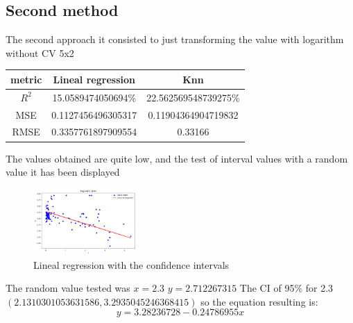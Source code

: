 \documentclass{article}
\begin{document}
\subsection{Second method}
The second approach it consisted to just transforming the value with logarithm without CV 5x2
\begin{center}
  \begin{tabular}{|c|c|c|}
    \hline
     metric & Lineal regression & Knn \\ \hline
     $R^2$& 15.0589474050694\%&22.562569548739275\%\\
     MSE&0.1127456496305317&0.11904364904719832\\
     RMSE&0.3357761897909554&0.33166\\
     \hline
  \end{tabular}
\end{center}
The values obtained are quite low, and the test of interval values with a random value it has been displayed 
\begin{figure}[h]
  \includegraphics[width=0.35\textwidth]{model_2.png}
  \caption{Lineal regression with the confidence intervals}

  \label{fig:example_intervals}
\end{figure}
The random value tested was $x=2.3$ $ y=2.712267315$
The CI of  95\% for 2.3 $(2.1310301053631586, 3.2935045246368415)$
so the equation resulting is: $$y=3.28236728 -0.24786955x $$
\end{document}
